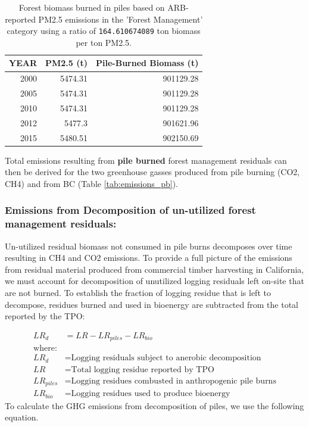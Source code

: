 \documentclass[a4paper]{article}
\begin{document}
\begin{table}[htb]
\centering
\begin{tabular}{rrr}
YEAR & PM2.5 (t) & Pile-Burned Biomass (t)\\
\hline
2000 & 5474.31 & 901129.28\\
2005 & 5474.31 & 901129.28\\
2010 & 5474.31 & 901129.28\\
2012 & 5477.3 & 901621.96\\
2015 & 5480.51 & 902150.69\\
\end{tabular}
\caption{Forest biomass burned in piles based on ARB-reported PM2.5 emissions in the 'Forest Management' category using a ratio of \texttt{164.610674089} ton biomass per ton PM2.5.}

\end{table}

Total emissions resulting from \textbf{pile burned} forest management residuals
can then be derived for the two greenhouse gasses produced from pile
burning (CO2, CH4) and from BC (Table \ref{tab:emissions_pb}).


\subsubsection{Emissions from Decomposition of un-utilized forest management residuals:}
\label{sec:orgheadline15}

Un-utilized residual biomass not consumed in pile burns decomposes over
time resulting in CH4  and CO2 emissions. To provide a
full picture of the emissions from residual material produced from
commercial timber harvesting in California, we must account for decomposition 
of unutilized logging residuals left on-site that are not burned. To establish
 the fraction of logging residue that is left to
decompose, residues burned and used in bioenergy are subtracted from the
total reported by the TPO:

\begin{align*}
LR_d &= LR - LR_{piles} - LR_{bio} \\
\text{where:}\\
LR_d &= \text{Logging residuals subject to anerobic decomposition} \\
LR &= \text{Total logging residue reported by TPO}\\
LR_{piles} &= \text{Logging residues combusted in anthropogenic pile burns}\\
LR_{bio} &= \text{Logging residues used to produce bioenergy}
\end{align*}
To calculate the \ac{GHG} emissions from decomposition of piles, we use the
following equation.
\end{document}
